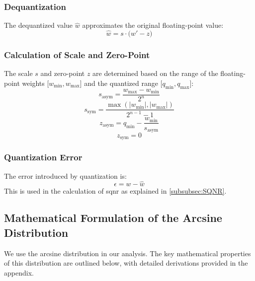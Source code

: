 \subsubsection{Dequantization}
The dequantized value \( \hat{w} \) approximates the original floating-point value:
\begin{equation}
\hat{w} = s \cdot \bigl(w' - z\bigr)
\label{eq:dequantization}
\end{equation}

\subsubsection{Calculation of Scale and Zero-Point}
The scale \( s \) and zero-point \( z \) are determined based on 
the range of the floating-point weights \(\bigl[w_{\text{min}}, w_{\text{max}}\bigr]\) 
and the quantized range \(\bigl[q_{\text{min}}, q_{\text{max}}\bigr]\):
\begin{equation}
    s_{\text{asym}} = \frac{w_{\text{max}} - w_{\text{min}}}{2^n}
\label{eq:calc_scale_asym}
\end{equation}
\begin{equation}
    s_{\text{sym}} = \frac{\max\left(|w_{\text{min}}|, |w_{\text{max}}|\right)}{2^{n-1} - 1}
\label{eq:calc_scale_sym}
\end{equation}
\begin{equation}
    z_{\text{asym}} = q_{\text{min}} - \frac{w_{\text{min}}}{s_{\text{asym}}}
\label{eq:calc_zero_point_asym}
\end{equation}
\begin{equation}
    z_{\text{sym}} = 0
\label{eq:calc_zero_point_sym}
\end{equation}


\subsubsection{Quantization Error}
The error introduced by quantization is:
\begin{equation}
\epsilon = w - \hat{w}
\label{eq:quant_error}
\end{equation}
This is used in the calculation of \gls{sqnr} as explained in \autoref{subsubsec:SQNR}.

\subsection{Mathematical Formulation of the Arcsine Distribution}

We use the arcsine distribution in our analysis. The key mathematical properties of this distribution are outlined below, with detailed derivations provided in the appendix.

